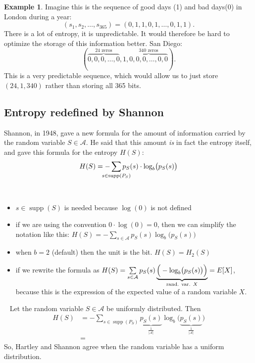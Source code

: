 \documentclass{article}
\newcommand\important[1]{\noindent {\underline{\textsc{#1}}} \ }
\DeclareMathOperator{\supp}{supp}
\theoremstyle{plain}
\theoremstyle{definition}
\newtheorem{exmp}{Example}
\theoremstyle{remark}
\begin{document}
\begin{exmp} Imagine this is the sequence of good days (1) and bad days(0) in London during a year:
\begin{equation*}
	(s_1, s_2, \dots, s_{365}) = (0, 1, 1, 0, 1, \dots, 0, 1, 1).
\end{equation*}
 There is a lot of entropy, it is unpredictable. It would therefore be hard to optimize the storage of this information better.
San Diego:
\begin{equation*}(\overbrace{0, 0, 0, \dots, 0}^{\text{24 zeros}}, 1, \overbrace{0, 0, 0, \dots, 0, 0}^{\text{340 zeros}}).
\end{equation*}
 This is a very predictable sequence, which would allow us to just store $(24, 1, 340)$ rather than storing all 365 bits.
\end{exmp}

\subsection{Entropy redefined by Shannon}
Shannon, in 1948, gave a new formula for the amount of information carried by the random variable $S \in \mathcal A$. He said that this amount \emph{is} in fact the entropy itself, and gave this formula for the entropy $H(S)$:
\begin{equation}
	H(S) = -\sum_{\mathclap{s \in \supp (P_S)}} p_S(s) \cdot \log_b \bigl( p_S(s) \bigr)
\end{equation}

\important{Comments}
\begin{itemize}
	\item $s \in \supp (S)$ is needed because $\log(0)$ is not defined
	\item if we are using the convention $0 \cdot \log(0) = 0$, then we can simplify the notation like this: $H(S) = - \sum_{s \in \mathcal A} p_S(s) \log_b \bigl(p_S(s)\bigr)$ 
	\item when $b=2$ (default) then the unit is the bit. $H(S) = H_2(S)$
	\item if we rewrite the formula as $H(S) = \sum\limits_{s \in \mathcal A} p_S(s) \underbrace{\Bigr(-\log_b \bigl(p_S(s)\bigl) \Bigl)}_{\text{rand. var. $X$}} = E[X]$, because this is the expression of the expected value of a random variable $X$.
\end{itemize}

\important{Example} Let the random variable $S \in \mathcal A$ be uniformly distributed. Then
\begin{align*}
	H(S) &= - \sum_{s \in \supp (P_S)} \underbrace{p_S(s)}_{\frac{1}{|\mathcal A|}} \log_b \bigl( \underbrace{p_S(s)}_{\frac{1}{|\mathcal A|}} \bigr) \\
	&=
\end{align*}
So, Hartley and Shannon agree when the random variable has a uniform distribution.
\end{document}
